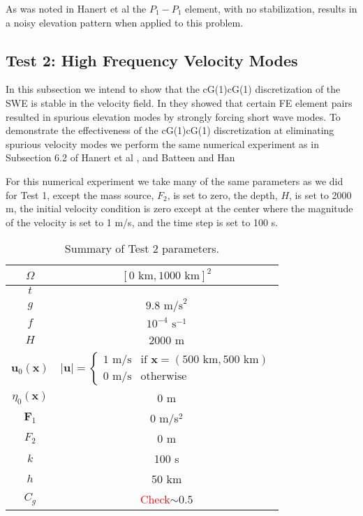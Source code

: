   As was noted in Hanert et al \cite{Hanert2002} the $P_1-P_1$ element, with no
  stabilization, results in a noisy elevation pattern when applied to this
  problem. %

\subsection{Test 2: High Frequency Velocity Modes}
  In this subsection we intend to show that the cG(1)cG(1) discretization of the
  SWE is stable in the velocity field. In \cite{Hanert2002} they showed that
  certain FE element pairs resulted in spurious elevation modes by strongly
  forcing short wave modes.  To demonstrate the effectiveness of the cG(1)cG(1)
  discretization at eliminating spurious velocity modes we perform the same
  numerical experiment as in Subsection 6.2 of Hanert et al \cite{Hanert2002},
  and Batteen and Han \cite{Batteen1981}

  For this numerical experiment we take many of the same parameters as we did
  for Test 1, except the mass source, $F_2$, is set to zero, the depth, $H$, is
  set to 2000 m, the initial velocity condition is zero except at the center
  where the magnitude of the velocity is set to 1 m/s, and the time step is set
  to 100 s.
  \def\arraystretch{1.25} %
  \begin{table}[H]
    \begin{center}
      \begin{tabular}{|c|c|}
        \hline
        $\Omega$ & $[0\text{ km}, 1000\text{ km}]^2$ \\ \hline
        $t$ &  \\ \hline
        $g$ & $9.8\text{ m/s}^2$ \\ \hline 
        $f$ & $10^{-4}\text{ s}^{-1}$ \\ \hline
        $H$ & 2000 m \\ \hline
        $\mathbf{u}_0(\mathbf{x})$ & 
          $\left|\mathbf{u}\right| = 
            \begin{cases}
              1\text{ m/s} & \text{if }\mathbf{x}=(500\text{ km}, 500\text{ km}) \\ 
              0\text{ m/s} & \text{otherwise}
            \end{cases}$ \\ \hline
          $\eta_0(\mathbf{x})$ & 0 m \\ \hline
        $\mathbf{F}_1$ & 0 m/s$^2$\\ \hline
        $F_2$ & 0 m\\ \hline
        $k$ & 100 s \\ \hline
        $h$ & 50 km \\ \hline
        $C_g$ & \textcolor{red}{Check}$\sim 0.5$ \\ \hline
      \end{tabular}
      \caption{Summary of Test 2 parameters.}
      \label{tab:HFVelocityParams}
    \end{center}
  \end{table}

